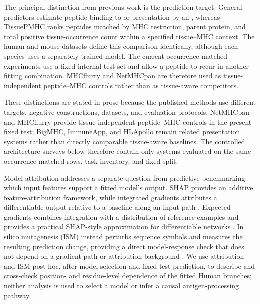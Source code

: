 The principal distinction from previous work is the prediction target. General predictors estimate peptide binding to or presentation by an \plainMHC{}, whereas TissuePMHC ranks peptides matched by MHC restriction, parent protein, and total positive tissue-occurrence count within a specified tissue--MHC context. The human and mouse datasets define this comparison identically, although each species uses a separately trained model. The current occurrence-matched experiments use a fixed internal test set and allow a peptide to recur in another fitting combination. MHCflurry and NetMHCpan are therefore used as tissue-independent peptide--MHC controls rather than as tissue-aware competitors.

These distinctions are stated in prose because the published methods use different targets, negative constructions, datasets, and evaluation protocols. NetMHCpan and MHCflurry provide tissue-independent peptide--MHC controls in the present fixed test; BigMHC, ImmuneApp, and HLApollo remain related presentation systems rather than directly comparable tissue-aware baselines. The controlled architecture surveys below therefore contain only systems evaluated on the same occurrence-matched rows, task inventory, and fixed split.

Model attribution addresses a separate question from predictive benchmarking: which input features support a fitted model's output. SHAP provides an additive feature-attribution framework, while integrated gradients attributes a differentiable output relative to a baseline along an input path \cite{lundberg2017shap,sundararajan2017integrated}. Expected gradients combines integration with a distribution of reference examples and provides a practical SHAP-style approximation for differentiable networks \cite{erion2021expected}. In silico mutagenesis (ISM) instead perturbs sequence symbols and measures the resulting prediction change, providing a direct model-response check that does not depend on a gradient path or attribution background \cite{alipanahi2015deepbind}. We use attribution and ISM post hoc, after model selection and fixed-test prediction, to describe and cross-check position- and residue-level dependence of the fitted Human branches; neither analysis is used to select a model or infer a causal antigen-processing pathway.
